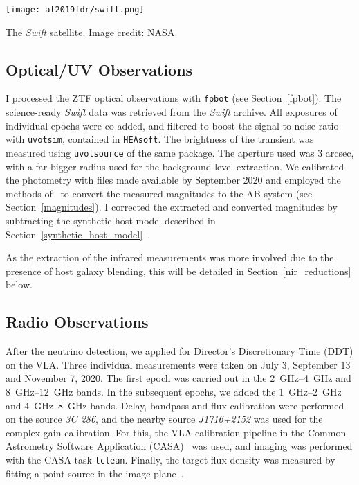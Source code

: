 \begin{marginfigure}
    \texttt{[image: at2019fdr/swift.png]}
    \caption[The \textit{Swift} satellite]{The \textit{Swift} satellite. Image credit: NASA.}
\end{marginfigure}

\subsection{Optical/UV Observations}
I processed the ZTF optical observations with \texttt{fpbot} (see Section~\ref{fpbot}). The science-ready \textit{Swift} data was retrieved from the \textit{Swift} archive. All exposures of individual epochs were co-added, and filtered to boost the signal-to-noise ratio with \texttt{uvotsim}, contained in \texttt{HEAsoft}. The brightness of the transient was measured using \texttt{uvotsource} of the same package. The aperture used was \num{3} arcsec, with a far bigger radius used for the background level extraction. We calibrated the photometry with files made available by September 2020 and employed the methods of~ to convert the measured magnitudes to the AB system (see Section~\ref{magnitudes}). I corrected the extracted and converted magnitudes by subtracting the synthetic host model described in Section~\ref{synthetic_host_model}~\cite{Reusch2022}.

As the extraction of the infrared measurements was more involved due to the presence of host galaxy blending, this will be detailed in Section~\ref{nir_reductions} below.

\subsection{Radio Observations}
After the neutrino detection, we applied for Director's Discretionary Time (DDT) on the VLA. Three individual measurements were taken on July 3, September 13 and November 7, 2020. The first epoch was carried out in the \SIrange{2}{4}{\giga\Hz} and \SIrange{8}{12}{\giga\Hz} bands. In the subsequent epochs, we added the \SIrange{1}{2}{\giga\Hz} and \SIrange{4}{8}{\giga\Hz} bands. Delay, bandpass and flux calibration were performed on the source \textit{3C 286}, and the nearby source\textit{ J1716+2152} was used for the complex gain calibration. For this, the VLA calibration pipeline in the Common Astrometry Software Application (CASA)~ was used, and imaging was performed with the CASA task \texttt{tclean}. Finally, the target flux density was measured by fitting a point source in the image plane~\cite{Reusch2022}.

